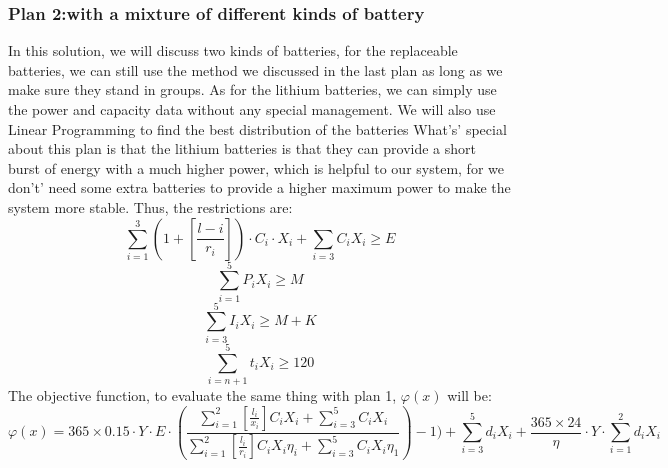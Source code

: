 \documentclass{article}
\begin{document}
\subsubsection{Plan 2:with a mixture of different kinds of battery}
In this solution, we will discuss two kinds of batteries, for the replaceable batteries, we can still use the method we discussed in the last plan as long as we make sure they stand
in groups. As for the lithium batteries, we can simply use the power and capacity data without any special management. We will also use Linear Programming to find the best distribution of
the batteries
What's' special about this plan is that the lithium batteries is that they can provide a short burst of energy with a much higher power, which is helpful to our system, for we don't' need some extra batteries
to provide a higher maximum power to make the system more stable.
Thus, the restrictions are:
$$\sum_{i=1}^3(1+[\frac{l-i}{r_i}]) \cdot C_i \cdot X_i + \sum_{i=3}C_iX_i\geq E$$
$$\sum_{i=1}^5P_iX_i\geq M$$
$$\sum_{i=3}^5I_iX_i\geq M+K$$
$$\sum_{i=n+1}^5 t_iX_i\geq 120$$
The objective function, to evaluate the same thing with plan 1, $\varphi (x)$ will be:
$$\varphi (x) = 365 \times 0.15 \cdot Y \cdot E \cdot (\frac{\sum^2_{i=1}[\frac{l_i}{x_i}]C_iX_i+\sum_{i=3}^5C_iX_i}{\sum^2_{i=1}[\frac{l_i}{r_i}]C_iX_i\eta _i+\sum_{i=3}^5C_iX_i\eta _1})-1)
    + \sum_{i=3} ^5d_iX_i+\frac{365 \times 24}{\eta } \cdot Y \cdot \sum_{i=1} ^2d_iX_i $$
\end{document}
